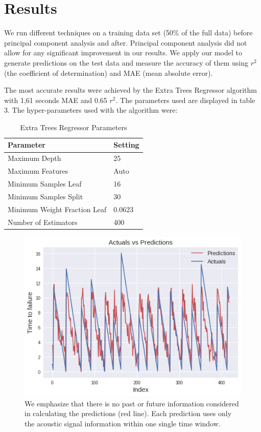 \documentclass[]{llncs} %
\begin{document}
\section{Results}
We run different techniques on a training data set (50\% of the full data) before principal component analysis and after. Principal component analysis did not allow for any significant improvement in our results. We apply our model to generate predictions on the test data  and measure the accuracy of them using $r^2$ (the coefficient of determination) and MAE (mean absolute error). \par 

The most accurate results were achieved by the Extra Trees Regressor algorithm with 1,61 seconds MAE and 0.65 $r^2$. The parameters used are displayed in table 3. %
The hyper-parameters used with the algorithm  were:

\begin{table}
	\begin{center}
		\caption{Extra Trees Regressor Parameters}
		\label{tab:hyperparameters}
		\begin{tabular}{l|l} 
			\textbf{Parameter} & \textbf{Setting}\\
			\hline
			Maximum Depth & 25 \\ 
			Maximum Features & Auto \\ 
			Minimum Samples Leaf & 16 \\ 
			Minimum Samples Split & 30 \\ 
			Minimum Weight Fraction Leaf & 0.0623 \\
			Number of Estimators & 400 \\
		\end{tabular}
	\end{center}
\end{table}

\par

\begin{figure}
	\centering
	\includegraphics[width=.9\linewidth]{results1}
	\caption{We emphasize that there is no past or future information considered in calculating the predictions (red line). Each prediction uses only the acoustic signal information within one single time window.}
	\label{fig:results1}
\end{figure}
\end{document}
